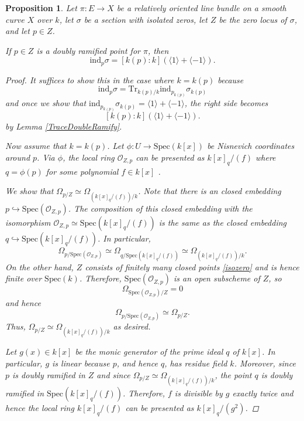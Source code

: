 \documentclass[12pt, reqno]{amsart}
\newtheorem{proposition}[theorem]{Proposition}
\theoremstyle{definition}
\newcommand{\Spec}{\mathrm{Spec }} %
\newcommand{\Tr}{\mathrm{Tr}} %
\newcommand{\ind}{\mathrm{ind}} %
\begin{document}
\begin{proposition}\label{euler double ramify}
Let $\pi: E \rightarrow X$ be a relatively oriented line bundle on a smooth curve $X$ over $k$, let $\sigma$ be a section with isolated zeros, let $Z$ be the zero locus of $\sigma$, and let $p \in Z$.

If $p \in Z$ is a doubly ramified point for $\pi$, then $$ \ind_p \sigma = [k(p):k]( \langle 1 \rangle + \langle - 1 \rangle).$$
\begin{proof}
It suffices to show this in the case where $k = k(p)$ because 
$$\ind_p \sigma = \Tr_{k(p)/k} \ind_{p_{k(p)}} \sigma_{k(p)}$$
and once we show that $\ind_{p_{k(p)}} \sigma_{k(p)} = \langle 1 \rangle + \langle -1 \rangle$, the right side becomes
$$[k(p):k] (\langle 1 \rangle + \langle -1 \rangle).$$
by Lemma \ref{TraceDoubleRamify}.

Now assume that $k = k(p)$. Let $\phi: U \rightarrow \Spec(k[x])$ be Nisnevich coordinates around $p$. Via $\phi$, the local ring $\mathscr{O}_{Z,p}$ can be presented as $k[x]_{q}/(f)$ where $q = \phi(p)$ for some polynomial $f \in k[x]$ \cite[Section 4, the discussion after Lemma 24 leading up to Lemma 27]{kwcubic}. 

We show that $\Omega_{p/Z} \simeq \Omega_{(k[x]_q/(f))/k}$. Note that there is an closed embedding $p \hookrightarrow \Spec(\mathscr{O}_{Z,p})$. The composition of this closed embedding with the isomorphism $\mathscr{O}_{Z,p} \simeq \Spec(k[x]_q/(f))$ is the same as the closed embedding $q \hookrightarrow \Spec(k[x]_q/(f))$. In particular, 
$$\Omega_{p/\Spec(\mathscr{O}_{Z,p})} \simeq \Omega_{q/\Spec(k[x]_q/(f))} \simeq \Omega_{(k[x]_q/(f))/k}.$$
On the other hand, $Z$ consists of finitely many closed points \ref{isozero} and is hence finite over $\Spec(k)$. Therefore, $\Spec(\mathscr{O}_{Z,p})$ is an open subscheme of $Z$, so 
$$\Omega_{\Spec(\mathscr{O}_{Z,p})/Z} = 0$$
and hence
$$\Omega_{p/\Spec(\mathscr{O}_{Z,p})} \simeq \Omega_{p/Z}.$$
Thus, $\Omega_{p/Z} \simeq \Omega_{(k[x]_q/(f))/k}$ as desired.


Let $g(x) \in k[x]$ be the monic generator of the prime ideal $q$ of $k[x]$. In particular, $g$ is linear because $p$, and hence $q$, has residue field $k$. Moreover, since $p$ is doubly ramified in $Z$ and since $\Omega_{p/Z} \simeq \Omega_{(k[x]_q/(f))/k}$, the point $q$ is doubly ramified in $\Spec(k[x]_q/(f))$. Therefore, $f$ is divisible by $g$ exactly twice and hence the local ring $k[x]_q/(f)$ can be presented as $k[x]_q/(g^2)$.


\end{proof}
\end{proposition}
\end{document}
